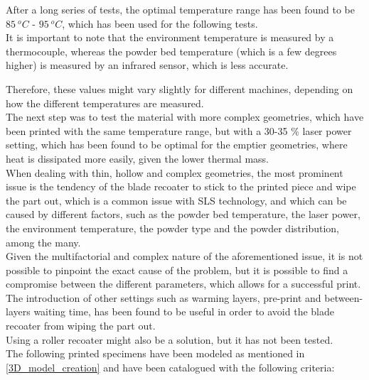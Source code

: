 \documentclass{article}
\begin{document}
        After a long series of tests, the optimal temperature range has been found to be $85 \ ^oC$ - $95 \ ^oC$, which has been
        used for the following tests. \\ 

        It is important to note that the environment temperature is measured by a thermocouple, whereas the 
        powder bed temperature (which is a few degrees higher) is measured by an infrared sensor, which  
        is less accurate. 

        Therefore, these values might vary slightly for different machines, depending on how the different 
        temperatures are measured. \\ 

        The next step was to test the material with more complex geometries, which have been printed with the same 
        temperature range, but with a 30-35 \% laser power setting, which has been found to be optimal for the 
        emptier geometries, where heat is dissipated more easily, given the lower thermal mass. \\ 

        When dealing with thin, hollow and complex geometries, the most prominent issue is the tendency of the 
        blade recoater to stick to the printed piece and wipe the part out, which is a common 
        issue with SLS technology, and which 
        can be caused by different factors, such as the powder bed temperature, the laser power, the 
        environment temperature, the powder type and the powder distribution, among the many. \\ 

        Given the multifactorial and complex nature of the aforementioned issue, it is not possible to 
        pinpoint the exact cause of the problem, but it is possible to find a compromise between the 
        different parameters, which allows for a successful print. \\
        
        The introduction of other settings such as warming layers, pre-print 
        and between-layers waiting time, has been found to be useful in order to avoid 
        the blade recoater from wiping the part out. \\

        Using a roller recoater might also be a solution, but it has not been tested. \\ 

        The following printed specimens have been modeled as mentioned in \ref{3D_model_creation} and 
        have been catalogued with the following criteria: 
\end{document}
